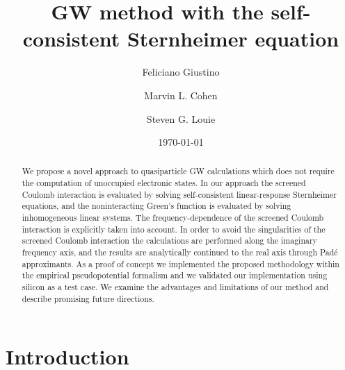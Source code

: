 \documentclass[twocolumn,prb,showpacs,superscriptaddress]{revtex4}
\begin{document}
\title{GW method with the self-consistent Sternheimer equation}

\author{Feliciano Giustino}
\author{Marvin L. Cohen}
\author{Steven G. Louie}
\date{\today}

\begin{abstract}
We propose a novel approach to quasiparticle GW calculations which 
does not require the computation of unoccupied electronic states. 
In our approach the screened Coulomb interaction
is evaluated by solving self-consistent linear-response Sternheimer equations,
and the noninteracting Green's function is evaluated by solving inhomogeneous 
linear systems. The frequency-dependence of the screened Coulomb interaction 
is explicitly taken into account. In order to avoid the singularities of the 
screened Coulomb interaction the calculations are performed
along the imaginary frequency axis, and the results are analytically continued 
to the real axis through Pad\'e approximants. As a proof of concept we implemented 
the proposed methodology within the empirical pseudopotential formalism and 
we validated our implementation using silicon as a test case. We examine 
the advantages and limitations of our method and describe promising future directions.
\end{abstract}


\maketitle

\section{Introduction}
\end{document}
